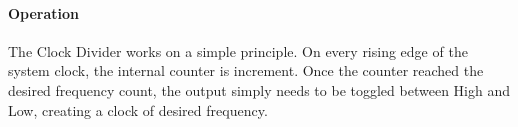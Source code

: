 \begin{table}[!h]
    \centering
    \caption{Input/Output of Clock Divider}
    \label{table:io_cd}
\end{table}
\newpage
\paragraph*{Operation}
The Clock Divider works on a simple principle.
On every rising edge of the system clock, the internal counter is increment.
Once the counter reached the desired frequency count, the output simply needs to be toggled between High and Low, creating a clock of desired frequency.


